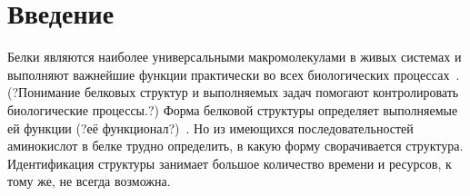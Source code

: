 \documentclass[14pt]{extarticle}
\begin{document}
\newpage


\section{Введение}
	\label{sec:intro}
	
	Белки являются наиболее универсальными макромолекулами в живых системах и выполняют важнейшие функции практически во всех биологических процессах~\cite{berg2002biochemistry}. (?Понимание белковых структур и выполняемых задач помогают контролировать биологические процессы.?)%
	Форма белковой структуры определяет выполняемые ей функции (?её функционал?)~\cite{berg2002biochemistry}. Но из имеющихся последовательностей аминокислот в белке трудно определить, в какую форму сворачивается структура. Идентификация структуры занимает большое количество времени и ресурсов, к тому же, не всегда возможна. 
\end{document}
